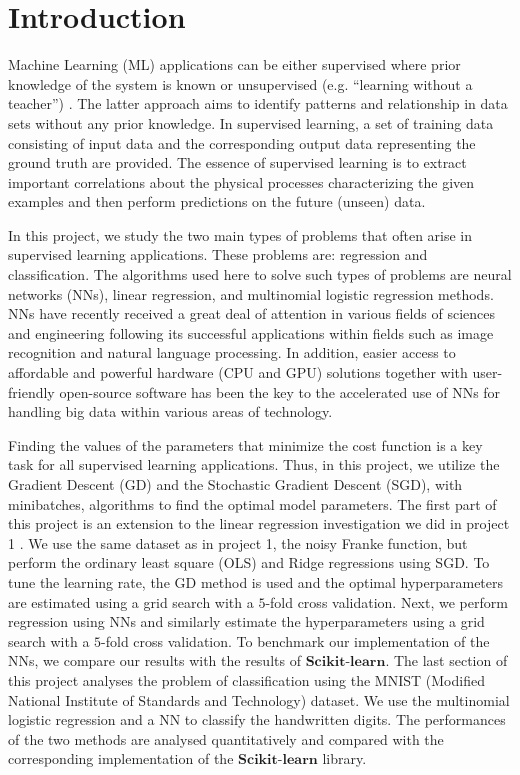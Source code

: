 \documentclass[a4paper]{article}
\begin{document}
\newpage

\newcommand{\half}{\frac{1}{2}}
\newcommand{\dx}{{\Delta x}}
\newcommand{\bigO}{{\mathcal{O}}}

\section{Introduction}
Machine Learning (ML) applications can be either supervised where prior knowledge of the system is known or unsupervised (e.g. “learning without a teacher”) \cite{hastie}. The latter approach aims to identify patterns and relationship in data sets without any prior knowledge. In supervised learning, a set of training data consisting of input data and the corresponding output data representing the ground truth are provided. The essence of supervised learning is to extract important correlations about the physical processes characterizing the given examples and then perform predictions on the future (unseen) data. 

In this project, we study the two main types of problems that often arise in supervised learning applications. These problems are: regression and classification. The algorithms used here to solve such types of problems are neural networks (NNs), linear regression, and multinomial logistic regression methods. NNs have recently received a great deal of attention in various fields of sciences and engineering following its successful applications within fields such as image recognition and natural language processing. In addition, easier access to affordable and powerful hardware (CPU and GPU) solutions together with user-friendly open-source software has been the key to the accelerated use of NNs for handling big data within various areas of technology. 

Finding the values of the parameters that minimize the cost function is a key task for all supervised learning applications. Thus, in this project, we utilize the Gradient Descent (GD) and the Stochastic Gradient Descent (SGD), with minibatches, algorithms to find the optimal model parameters. The first part of this project is an extension to the linear regression investigation we did in project 1 \cite{Jing2020}. We use the same dataset as in project 1, the noisy Franke function, but perform the ordinary least square (OLS) and Ridge regressions using SGD. To tune the learning rate, the GD method is used and the optimal hyperparameters are estimated using a grid search with a $5$-fold cross validation. Next, we perform regression using NNs and similarly estimate the hyperparameters using a grid search with a $5$-fold cross validation. To benchmark our implementation of the NNs, we compare our results with the results of $\mathbf{Scikit}$-$\mathbf{learn}$. The last section of this project analyses the problem of classification using the MNIST (Modified National Institute of Standards and Technology) dataset. We use the multinomial logistic regression and a NN to classify the handwritten digits. The performances of the two methods are analysed quantitatively and compared with the corresponding implementation of the $\mathbf{Scikit}$-$\mathbf{learn}$ library.
\end{document}
